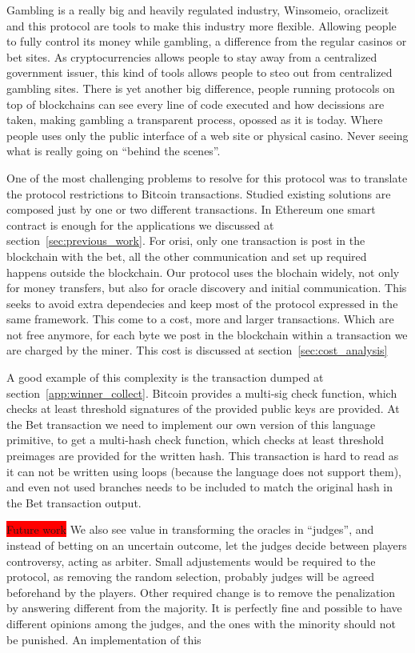 Gambling is a really big and heavily regulated industry, Winsomeio, oraclizeit
  and this protocol are tools  to make this industry more flexible.
Allowing people to fully control its money while gambling, a difference from
  the regular casinos or bet sites.
As cryptocurrencies allows people to stay away from a centralized government
  issuer, this kind of tools allows people to steo out from centralized gambling
  sites.
There is yet another big difference, people running protocols on top of
  blockchains can see every line of code executed and how decissions are taken,
  making gambling a transparent process, opossed as it is today.
Where people uses only the public interface of a web site or physical casino.
Never seeing what is really going on ``behind the scenes''.

One of the most challenging problems to resolve for this protocol was to
  translate the protocol restrictions to Bitcoin transactions.
Studied existing solutions are composed just by one or two different
  transactions.
In Ethereum one smart contract is enough for the applications we discussed at
  section~\ref{sec:previous_work}.
For orisi, only one transaction is post in the blockchain with the bet, all
  the other communication and set up required happens outside the blockchain.
Our protocol uses the blochain widely, not only for money transfers, but also
  for oracle discovery and initial communication.
This seeks to avoid extra dependecies and keep most of the protocol expressed
  in the same framework.
This come to a cost, more and larger transactions.
Which are not free anymore, for each byte we post in the blockchain within
  a transaction we are charged by the miner.
This cost is discussed at section~\ref{sec:cost_analysis}

A good example of this complexity is the transaction dumped at
  section~\ref{app:winner_collect}.
Bitcoin provides a multi-sig check function, which checks at least
  threshold signatures of the provided public keys are provided.
At the Bet transaction we need to implement our own version of this
  language primitive, to get a multi-hash check function, which checks
  at least threshold preimages are provided for the written hash.
This transaction is hard to read as it can not be written using loops (because
  the language does not support them), and even not used branches needs to be
  included to match the original hash in the Bet transaction output.

\colorbox{red}{Future work}
We also see value in transforming the oracles in ``judges'', and instead of
  betting on an uncertain outcome, let the judges decide between players
  controversy, acting as arbiter.
Small adjustements would be required to the protocol, as removing the random
  selection, probably judges will be agreed beforehand by the players.
Other required change is to remove the penalization by answering different
  from the majority.
It is perfectly fine and possible to have different opinions among the
  judges, and the ones with the minority should not be punished.
An implementation of this

